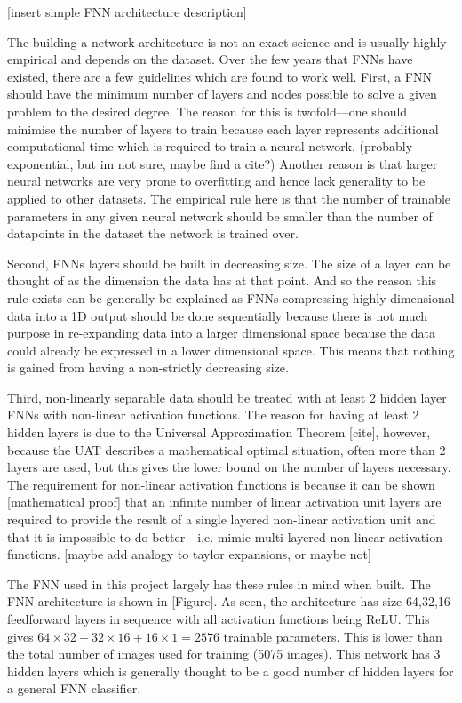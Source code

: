\documentclass[a4paper,fleqn,usenatbib]{mnras}
\begin{document}
[insert simple FNN architecture description]

The building a network architecture is not an exact science and is usually highly empirical and depends on the dataset. Over the few years that FNNs have existed, there are a few guidelines which are found to work well. First, a FNN should have the minimum number of layers and nodes possible to solve a given problem to the desired degree. The reason for this is twofold---one should minimise the number of layers to train because each layer represents additional computational time which is required to train a neural network. (probably exponential, but im not sure, maybe find a cite?) Another reason is that larger neural networks are very prone to overfitting and hence lack generality to be applied to other datasets. The empirical rule here is that the number of trainable parameters in any given neural network should be smaller than the number of datapoints in the dataset the network is trained over. 

Second, FNNs layers should be built in decreasing size. The size of a layer can be thought of as the dimension the data has at that point. And so the reason this rule exists can be generally be explained as FNNs compressing highly dimensional data into a 1D output should be done sequentially because there is not much purpose in re-expanding data into a larger dimensional space because the data could already be expressed in a lower dimensional space. This means that nothing is gained from having a non-strictly decreasing size. 

Third, non-linearly separable data should be treated with at least 2 hidden layer FNNs with non-linear activation functions. The reason for having at least 2 hidden layers is due to the Universal Approximation Theorem [cite], however, because the UAT describes a mathematical optimal situation, often more than 2 layers are used, but this gives the lower bound on the number of layers necessary. The requirement for non-linear activation functions is because it can be shown [mathematical proof] that an infinite number of linear activation unit layers are required to provide the result of a single layered non-linear activation unit and that it is impossible to do better---i.e. mimic multi-layered non-linear activation functions. [maybe add analogy to taylor expansions, or maybe not]

The FNN used in this project largely has these rules in mind when built. The FNN architecture is shown in [Figure]. As seen, the architecture has size 64,32,16 feedforward layers in sequence with all activation functions being ReLU. This gives $64\times 32+32\times 16 +16\times 1 = 2576$ trainable parameters. This is lower than the total number of images used for training (5075 images). This network has 3 hidden layers which is generally thought to be a good number of hidden layers for a general FNN classifier. 
\end{document}
